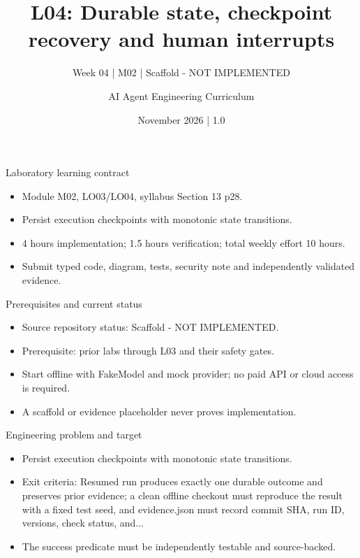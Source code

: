 \documentclass[aspectratio=169,10pt]{beamer}
\title[L04 - Agent Engineering]{L04: Durable state, checkpoint recovery and human interrupts}
\subtitle{Week 04 | M02 | Scaffold - NOT IMPLEMENTED}
\author{AI Agent Engineering Curriculum}
\date{November 2026 | 1.0}
\begin{document}
\begin{frame}\titlepage\end{frame}

\begin{frame}{Laboratory learning contract}
\small
\begin{itemize}
\item Module M02, LO03/LO04, syllabus Section 13 p28.
\item Persist execution checkpoints with monotonic state transitions.
\item 4 hours implementation; 1.5 hours verification; total weekly effort 10 hours.
\item Submit typed code, diagram, tests, security note and independently validated evidence.
\end{itemize}

\end{frame}

\begin{frame}{Prerequisites and current status}
\small
\begin{itemize}
\item Source repository status: Scaffold - NOT IMPLEMENTED.
\item Prerequisite: prior labs through L03 and their safety gates.
\item Start offline with FakeModel and mock provider; no paid API or cloud access is required.
\item A scaffold or evidence placeholder never proves implementation.
\end{itemize}

\end{frame}

\begin{frame}{Engineering problem and target}
\small
\begin{itemize}
\item Persist execution checkpoints with monotonic state transitions.
\item Exit criteria: Resumed run produces exactly one durable outcome and preserves prior evidence; a clean offline checkout must reproduce the result with a fixed test seed, and evidence.json must record commit SHA, run ID, versions, check status, and...
\item The success predicate must be independently testable and source-backed.
\end{itemize}

\end{frame}
\end{document}

